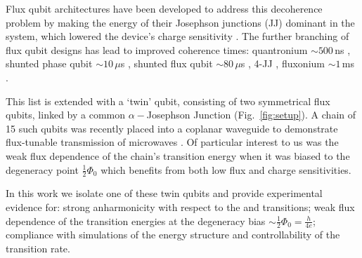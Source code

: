 Flux qubit architectures have been  developed to address this decoherence problem
by making  the energy of their  Josephson junctions (JJ) dominant  in the system,
which    lowered    the    device's   charge    sensitivity    \cite{orlando1999}
\cite{chiorescu2003}  \cite{mooij1999}.   The  further branching  of  flux  qubit
designs   has  lead   to   improved  coherence   times:  quantronium   $\sim500\,$ns
\cite{cottet2002} \cite{gu2017}, shunted phase  qubit $\sim10\,\mu $s \cite{stern2014}
, shunted  flux qubit $\sim80\,\mu$s  \cite{yan2016} , 4-JJ  \cite{qui2016}, fluxonium
$\sim1\,$ms \cite{pop2014}.
 
This list  is extended with  a `twin' qubit,  consisting of two  symmetrical flux
qubits, linked  by a  common $  \alpha-$Josephson Junction  (Fig.~\ref{fig:setup}).  A
chain  of  15 such  qubits  was  recently placed  into  a  coplanar waveguide  to
demonstrate  flux-tunable  transmission   of  microwaves  \cite{shulga2018}.   Of
particular interest to us was the  weak flux dependence of the chain's transition
energy  when it  was  biased  to the  degeneracy  point  $\frac{1}{2}\Phi_0 $  which
benefits from both low flux and charge sensitivities.
 
In  this work  we  isolate one  of  these twin  qubits  and provide  experimental
evidence for: strong anharmonicity with  respect to the \ilra{} and
\ilra{}  transitions;  weak  flux   dependence  of  the  transition
energies at  the degeneracy  bias $\sim  \frac{1}{2}\Phi_0 =  \frac{h}{4e}$; compliance
with   simulations  of   the  energy   structure  and   controllability  of   the
~\ilra~ transition rate.

